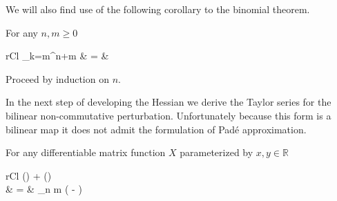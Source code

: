 We will also find use of the following corollary to the binomial theorem.
\begin{corollary}
	For any $n,m \ge 0$
	\begin{IEEEeqnarray*}{rCl}
		\sum_{k=m}^{n+m} 
			& = & 
	\end{IEEEeqnarray*}
\end{corollary}

\begin{IEEEproof}
	Proceed by induction on $n$.\hfill\IEEEQEDhere
\end{IEEEproof}

In the next step of developing the Hessian we derive the Taylor series for the bilinear 
non-commutative perturbation. Unfortunately because this form is a bilinear map it does
not admit the formulation of Pad\'{e} approximation.
\begin{corollary}
	For any differentiable matrix function $X$ parameterized by $x,y \in \mathbb{R}$
	\begin{IEEEeqnarray*}{rCl}
		{
			\left[\frac{\partial}{\partial x} \sum_{n=1}^\infty \frac{1}{\left(n+1\right)!} \operatorname{ad}_X^n \cdotp \right]\left(\right)
			+ \left[\frac{\partial}{\partial y} \sum_{n=1}^\infty \frac{1}{\left(n+1\right)!} \operatorname{ad}_X^n \cdotp \right]\left(\right)
		}\\\quad
			& = & \sum_{n \ge m }  \left( -  \right) 
	\end{IEEEeqnarray*}
\end{corollary}

